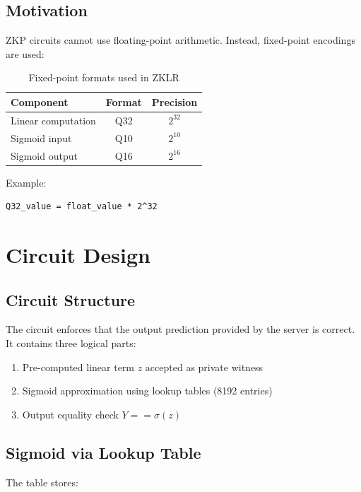 \subsection{Motivation}
ZKP circuits cannot use floating-point arithmetic. Instead, fixed-point encodings are used:

\begin{table}[h]
\centering
\begin{tabular}{|l|c|c|}
\hline
Component & Format & Precision \\
\hline
Linear computation & Q32 & \(2^{32}\) \\
Sigmoid input & Q10 & \(2^{10}\) \\
Sigmoid output & Q16 & \(2^{16}\) \\
\hline
\end{tabular}
\caption{Fixed-point formats used in ZKLR}
\end{table}

Example:

\begin{verbatim}
Q32_value = float_value * 2^32
\end{verbatim}

\section{Circuit Design}\label{sec:circuit}

\subsection{Circuit Structure}
The circuit enforces that the output prediction provided by the server is correct. It contains three logical parts:

\begin{enumerate}
    \item Pre-computed linear term \( z \) accepted as private witness
    \item Sigmoid approximation using lookup tables (8192 entries)
    \item Output equality check \(Y == \sigma(z)\)
\end{enumerate}

\subsection{Sigmoid via Lookup Table}
The table stores:

